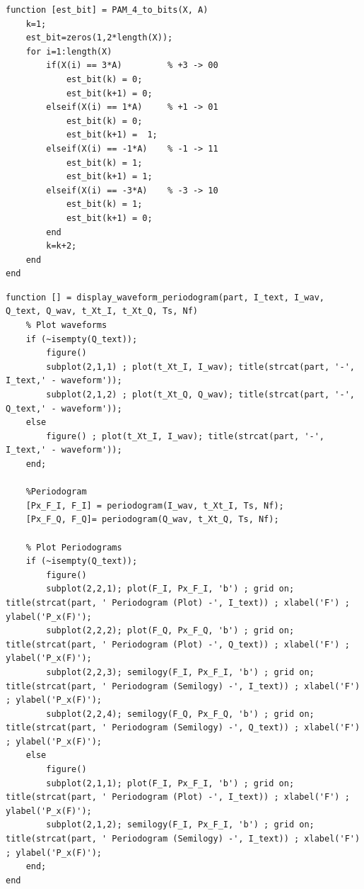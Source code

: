 \documentclass[11pt]{article}
\begin{document}
    \begin{lstlisting}[caption = {\texttt{PAM\_4\_to\_bits.m}}]
function [est_bit] = PAM_4_to_bits(X, A)
    k=1;
    est_bit=zeros(1,2*length(X));
    for i=1:length(X)
        if(X(i) == 3*A)         % +3 -> 00
            est_bit(k) = 0;
            est_bit(k+1) = 0;
        elseif(X(i) == 1*A)     % +1 -> 01
            est_bit(k) = 0;
            est_bit(k+1) =  1;
        elseif(X(i) == -1*A)    % -1 -> 11
            est_bit(k) = 1;
            est_bit(k+1) = 1;
        elseif(X(i) == -3*A)    % -3 -> 10
            est_bit(k) = 1;
            est_bit(k+1) = 0;
        end
        k=k+2;
    end
end
    \end{lstlisting}
    \begin{lstlisting}[caption = {\texttt{display\_waveform\_periodogram.m}}]
function [] = display_waveform_periodogram(part, I_text, I_wav, Q_text, Q_wav, t_Xt_I, t_Xt_Q, Ts, Nf)
    % Plot waveforms
    if (~isempty(Q_text)); 
        figure()
        subplot(2,1,1) ; plot(t_Xt_I, I_wav); title(strcat(part, '-', I_text,' - waveform'));
        subplot(2,1,2) ; plot(t_Xt_Q, Q_wav); title(strcat(part, '-', Q_text,' - waveform'));
    else
        figure() ; plot(t_Xt_I, I_wav); title(strcat(part, '-', I_text,' - waveform'));
    end;
    
    %Periodogram
    [Px_F_I, F_I] = periodogram(I_wav, t_Xt_I, Ts, Nf);
    [Px_F_Q, F_Q]= periodogram(Q_wav, t_Xt_Q, Ts, Nf);

    % Plot Periodograms
    if (~isempty(Q_text)); 
        figure()
        subplot(2,2,1); plot(F_I, Px_F_I, 'b') ; grid on; title(strcat(part, ' Periodogram (Plot) -', I_text)) ; xlabel('F') ; ylabel('P_x(F)');
        subplot(2,2,2); plot(F_Q, Px_F_Q, 'b') ; grid on; title(strcat(part, ' Periodogram (Plot) -', Q_text)) ; xlabel('F') ; ylabel('P_x(F)');
        subplot(2,2,3); semilogy(F_I, Px_F_I, 'b') ; grid on; title(strcat(part, ' Periodogram (Semilogy) -', I_text)) ; xlabel('F') ; ylabel('P_x(F)');
        subplot(2,2,4); semilogy(F_Q, Px_F_Q, 'b') ; grid on; title(strcat(part, ' Periodogram (Semilogy) -', Q_text)) ; xlabel('F') ; ylabel('P_x(F)');
    else
        figure()
        subplot(2,1,1); plot(F_I, Px_F_I, 'b') ; grid on; title(strcat(part, ' Periodogram (Plot) -', I_text)) ; xlabel('F') ; ylabel('P_x(F)');
        subplot(2,1,2); semilogy(F_I, Px_F_I, 'b') ; grid on; title(strcat(part, ' Periodogram (Semilogy) -', I_text)) ; xlabel('F') ; ylabel('P_x(F)');
    end;
end
    \end{lstlisting}
\end{document}
